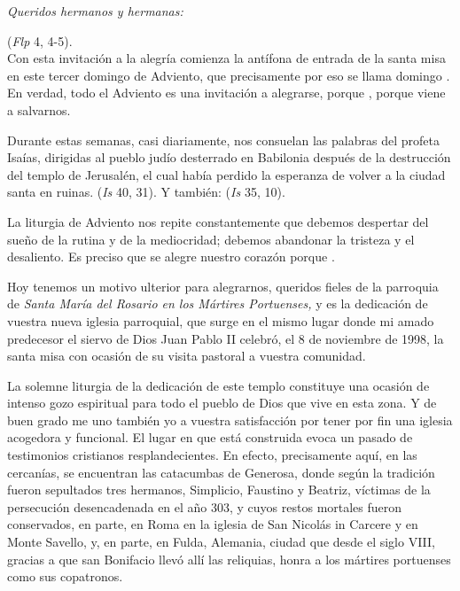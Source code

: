 				\begin{body}
					\emph{Queridos hermanos y hermanas:}
					
					 (\emph{Flp} 4, 4-5).\\ Con esta invitación a la alegría comienza la antífona de entrada de la santa misa en este tercer domingo de Adviento, que precisamente por eso se llama domingo . En verdad, todo el Adviento es una invitación a alegrarse, porque , porque viene a salvarnos.
					
					Durante estas semanas, casi diariamente, nos consuelan las palabras del profeta Isaías, dirigidas al pueblo judío desterrado en Babilonia después de la destrucción del templo de Jerusalén, el cual había perdido la esperanza de volver a la ciudad santa en ruinas.  (\emph{Is} 40, 31). Y también:  (\emph{Is} 35, 10).
					
					La liturgia de Adviento nos repite constantemente que debemos despertar del sueño de la rutina y de la mediocridad; debemos abandonar la tristeza y el desaliento. Es preciso que se alegre nuestro corazón porque .
					
					Hoy tenemos un motivo ulterior para alegrarnos, queridos fieles de la parroquia de \emph{Santa María del Rosario en los Mártires Portuenses,} y es la dedicación de vuestra nueva iglesia parroquial, que surge en el mismo lugar donde mi amado predecesor el siervo de Dios Juan Pablo II celebró, el 8 de noviembre de 1998, la santa misa con ocasión de su visita pastoral a vuestra comunidad.
					
					La solemne liturgia de la dedicación de este templo constituye una ocasión de intenso gozo espiritual para todo el pueblo de Dios que vive en esta zona. Y de buen grado me uno también yo a vuestra satisfacción por tener por fin una iglesia acogedora y funcional. El lugar en que está construida evoca un pasado de testimonios cristianos resplandecientes. En efecto, precisamente aquí, en las cercanías, se encuentran las catacumbas de Generosa, donde según la tradición fueron sepultados tres hermanos, Simplicio, Faustino y Beatriz, víctimas de la persecución desencadenada en el año 303, y cuyos restos mortales fueron conservados, en parte, en Roma en la iglesia de San Nicolás in Carcere y en Monte Savello, y, en parte, en Fulda, Alemania, ciudad que desde el siglo VIII, gracias a que san Bonifacio llevó allí las reliquias, honra a los mártires portuenses como sus copatronos.
					

\end{body}
